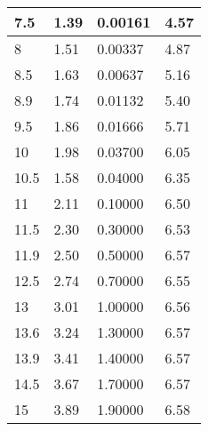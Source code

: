 \documentclass{scrartcl}
\begin{document}
\begin{longtable}{|l|l|l|l|}
        7.5    & 1.39    & 0.00161       & 4.57    \\ \hline
        8      & 1.51    & 0.00337       & 4.87    \\ \hline
        8.5    & 1.63    & 0.00637       & 5.16    \\ \hline
        8.9    & 1.74    & 0.01132       & 5.40    \\ \hline
        9.5    & 1.86    & 0.01666       & 5.71    \\ \hline
        10     & 1.98    & 0.03700       & 6.05    \\ \hline
        10.5   & 1.58    & 0.04000       & 6.35    \\ \hline
        11     & 2.11    & 0.10000       & 6.50    \\ \hline
        11.5   & 2.30    & 0.30000       & 6.53    \\ \hline
        11.9   & 2.50    & 0.50000       & 6.57    \\ \hline
        12.5   & 2.74    & 0.70000       & 6.55    \\ \hline
        13     & 3.01    & 1.00000       & 6.56    \\ \hline
        13.6   & 3.24    & 1.30000       & 6.57    \\ \hline
        13.9   & 3.41    & 1.40000       & 6.57    \\ \hline
        14.5   & 3.67    & 1.70000       & 6.57    \\ \hline
        15     & 3.89    & 1.90000       & 6.58    \\ \hline
        \end{longtable}
        
\end{document}
